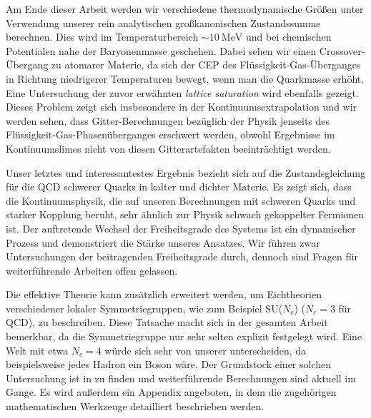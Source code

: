 {Am Ende dieser Arbeit werden wir verschiedene thermodynamische Grö\-ßen unter
Verwendung unserer rein analytischen großkanonischen Zu\-stands\-summe
berechnen. Dies wird im Temperaturbereich $\sim 10 \:\mathrm{MeV}$ und bei
chemischen Potentialen nahe der Baryonenmasse geschehen. Dabei sehen wir einen
Crossover-Übergang zu atomarer Materie, da sich der CEP des
Flüssigkeit-Gas-Überganges in Richtung niedrigerer Temperaturen bewegt, wenn man
die Quarkmasse erhöht. Eine Untersuchung der zuvor erwähnten \emph{lattice
  saturation} wird ebenfalls gezeigt. Dieses Problem zeigt sich insbesondere in
der Kontinuumsextrapolation und wir werden sehen, dass Gitter-Berechnungen
bezüglich der Physik jenseits des Flüssigkeit-Gas-Pha\-sen\-über\-ganges
erschwert werden, obwohl Ergebnisse im Kontinuumslimes nicht von diesen
Gitterartefakten be\-ein\-träch\-tigt werden.

Unser letztes und interessantestes Ergebnis bezieht sich auf die
Zustandsgleichung für die QCD schwerer Quarks in kalter und dichter Materie. Es
zeigt sich, dass die Kontinuumsphysik, die auf unseren Berechnungen mit schweren
Quarks und starker Kopplung beruht, sehr ähnlich zur Physik schwach gekoppelter
Fermionen ist. Der auftretende Wechsel der Freiheitsgrade des Systems ist ein
dynamischer Prozess und demonstriert die Stärke unseres Ansatzes. Wir führen
zwar Untersuchungen der beitragenden Freiheitsgrade durch, dennoch sind Fragen
für weiterführende Arbeiten offen gelassen.

Die effektive Theorie kann zusätzlich erweitert werden, um Eichtheorien
verschiede\-ner lokaler Symmetriegruppen, wie zum Beispiel SU($N_c$) ($N_c = 3$
für QCD), zu beschrei\-ben. Diese Tatsache macht sich in der gesamten Arbeit
bemerkbar, da die Symmetriegruppe nur sehr selten explizit festgelegt wird. Eine
Welt mit etwa $N_c = 4$ würde sich sehr von unserer unterscheiden, da
beispielsweise jedes Hadron ein Boson wäre. Der Grundstock einer solchen
Untersuchung ist in  zu finden und weiterführende
Berechnungen sind aktuell im Gange. Es wird außerdem ein Appendix angeboten, in
dem die zugehörigen mathematischen Werkzeuge detailliert beschrieben werden.


\par}

